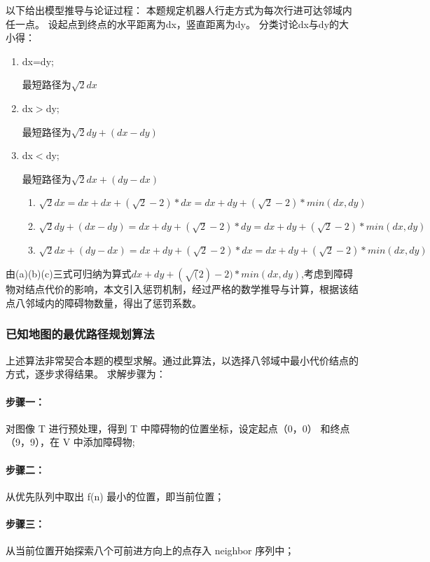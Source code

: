 \documentclass[withoutpreface,bwprint]{cumcmthesis} %
\begin{document}
以下给出模型推导与论证过程：
本题规定机器人行走方式为每次行进可达邻域内任一点。
设起点到终点的水平距离为dx，竖直距离为dy。
分类讨论dx与dy的大小得：
\begin{enumerate}[itemindent=1em] 
    \renewcommand{\labelenumi}{\theenumi.}
    \item dx=dy;
    
    最短路径为$\sqrt{2}dx$
    \item dx$>$dy;
    
    最短路径为$\sqrt{2}dy+(dx-dy)$
    \item dx$<$dy;
    
    最短路径为$\sqrt{2}dx+(dy-dx)$
    \begin{enumerate}[itemindent=1em] 
        \renewcommand{\labelenumi}{(\theenumi)}
        \item $\sqrt{2}dx=dx+dx+(\sqrt{2} - 2) * dx=dx + dy + (\sqrt{2} - 2) * min(dx,dy)$
        
        \item $\sqrt{2}dy+(dx-dy)=dx+dy+(\sqrt{2} - 2)*dy=dx + dy + (\sqrt{2} - 2) * min(dx,dy)$
        
        \item $\sqrt{2}dx+(dy-dx)=dx+dy+(\sqrt{2} - 2)*dx=dx + dy + (\sqrt{2} - 2) * min(dx,dy)$
    \end{enumerate}
\end{enumerate}

由(a)(b)(c)三式可归纳为算式$dx + dy + (\sqrt(2) - 2) * min(dx,dy)$,考虑到障碍物对结点代价的影响，本文引入惩罚机制，经过严格的数学推导与计算，根据该结点八邻域内的障碍物数量，得出了惩罚系数。


\subsubsection{已知地图的最优路径规划算法}
上述算法非常契合本题的模型求解。通过此算法，以选择八邻域中最小代价结点的方式，逐步求得结果。 求解步骤为： 

\paragraph{步骤一：}
对图像 T 进行预处理，得到 T 中障碍物的位置坐标，设定起点（0，0） 和终点（9，9），在 V 中添加障碍物;
\paragraph{步骤二：}
从优先队列中取出 f(n) 最小的位置，即当前位置；

\paragraph{步骤三：}
从当前位置开始探索八个可前进方向上的点存入 neighbor 序列中；
\end{document}
